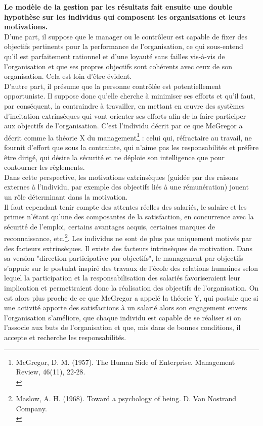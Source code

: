 \documentclass{kaobook}
\begin{document}
\textbf{Le modèle de la gestion par les résultats fait ensuite une double hypothèse sur les individus qui composent les organisations et leurs motivations.}\\
D’une part, il suppose que le manager ou le contrôleur est capable de fixer des objectifs pertinents pour la performance de l’organisation, ce qui sous-entend qu'il est parfaitement rationnel et d’une loyauté sans failles vis-à-vis de l’organisation et que ses propres objectifs sont cohérents avec ceux de son organisation. Cela est loin d’être évident.\\
D’autre part, il présume que la personne contrôlée est potentiellement opportuniste. Il suppose donc qu’elle cherche à minimiser ses efforts et qu’il faut, par conséquent, la contraindre à travailler, en mettant en œuvre des systèmes d’incitation extrinsèques qui vont orienter ses efforts afin de la faire participer aux objectifs de l’organisation. C’est l’individu décrit par ce que McGregor a décrit comme la théorie X du management\footnote{McGregor, D. M. (1957). The Human Side of Enterprise. Management Review, 46(11), 22‑28.\\} : celui qui, réfractaire au travail, ne fournit d’effort que sous la contrainte, qui n’aime pas les responsabilités et préfère être dirigé, qui désire la sécurité et ne déploie son intelligence que pour contourner les règlements.\\
Dans cette perspective, les motivations extrinsèques (guidée par des raisons externes à l’individu, par exemple des objectifs liés à une rémunération) jouent un rôle déterminant dans la motivation.\\
Il faut cependant tenir compte des attentes réelles des salariés, le salaire et les primes n’étant qu’une des composantes de la satisfaction, en concurrence avec la sécurité de l’emploi, certains avantages acquis, certaines marques de reconnaissance, etc.\footnote{Maslow, A. H. (1968). Toward a psychology of being. D. Van Nostrand Company.\\}. Les individus ne sont de plus pas uniquement motivés par des facteurs extrinsèques. Il existe des facteurs intrinsèques de motivation. Dans sa version "direction participative par objectifs",  le management par objectifs s’appuie sur le postulat inspiré des travaux de l’école des relations humaines selon lequel la participation et la responsabilisation des salariés favoriseraient leur implication et permettraient donc la réalisation des objectifs de l’organisation. On est alors plus proche de ce que McGregor a appelé la théorie Y, qui postule que si une activité apporte des satisfactions à un salarié alors son engagement envers l'organisation s'améliore, que chaque individu est capable de se réaliser si on l'associe aux buts de l'organisation et que, mis dans de bonnes conditions, il accepte et recherche les responsabilités.\\
\end{document}
